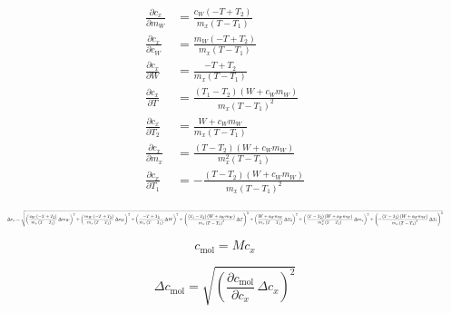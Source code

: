 \documentclass{article}
\begin{document}
  \begin{align}
    \frac{\partial c_x}{\partial m_{W}} &= \frac{c_{W} \left(- T + T_{2}\right)}{m_{x} \left(T - T_{1}\right)} \\
    \frac{\partial c_x}{\partial c_{W}} &= \frac{m_{W} \left(- T + T_{2}\right)}{m_{x} \left(T - T_{1}\right)} \\
    \frac{\partial c_x}{\partial W} &= \frac{- T + T_{2}}{m_{x} \left(T - T_{1}\right)} \\
    \frac{\partial c_x}{\partial T} &= \frac{\left(T_{1} - T_{2}\right) \left(W + c_{W} m_{W}\right)}{m_{x} \left(T - T_{1}\right)^{2}} \\
    \frac{\partial c_x}{\partial T_{2}} &= \frac{W + c_{W} m_{W}}{m_{x} \left(T - T_{1}\right)} \\
    \frac{\partial c_x}{\partial m_{x}} &= \frac{\left(T - T_{2}\right) \left(W + c_{W} m_{W}\right)}{m_{x}^{2} \left(T - T_{1}\right)} \\
    \frac{\partial c_x}{\partial T_{1}} &= - \frac{\left(T - T_{2}\right) \left(W + c_{W} m_{W}\right)}{m_{x} \left(T - T_{1}\right)^{2}}
  \end{align}

  \begin{equation}
	\resizebox{\textwidth}{!}{$\displaystyle
	\Delta c_x = \sqrt{\left(\frac{c_{W} \left(- T + T_{2}\right)}{m_{x} \left(T - T_{1}\right)}\,\Delta m_{W}\right)^2 + \left(\frac{m_{W} \left(- T + T_{2}\right)}{m_{x} \left(T - T_{1}\right)}\,\Delta c_{W}\right)^2 + \left(\frac{- T + T_{2}}{m_{x} \left(T - T_{1}\right)}\,\Delta W\right)^2 + \left(\frac{\left(T_{1} - T_{2}\right) \left(W + c_{W} m_{W}\right)}{m_{x} \left(T - T_{1}\right)^{2}}\,\Delta T\right)^2 + \left(\frac{W + c_{W} m_{W}}{m_{x} \left(T - T_{1}\right)}\,\Delta T_{2}\right)^2 + \left(\frac{\left(T - T_{2}\right) \left(W + c_{W} m_{W}\right)}{m_{x}^{2} \left(T - T_{1}\right)}\,\Delta m_{x}\right)^2 + \left(- \frac{\left(T - T_{2}\right) \left(W + c_{W} m_{W}\right)}{m_{x} \left(T - T_{1}\right)^{2}}\,\Delta T_{1}\right)^2}
	$}
  \end{equation}

  \begin{equation} c_{\mathrm{mol}} = M c_{x} \end{equation}

  \begin{equation} \Delta c_{\mathrm{mol}} = \sqrt{\left(\frac{\partial c_{\mathrm{mol}}}{\partial c_{x}}\,\Delta c_{x}\right)^2} \end{equation}
\end{document}
